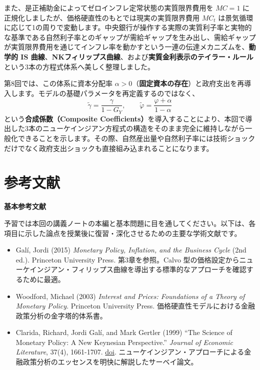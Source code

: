 \documentclass[
  japanese,
  lualatex,
  ja=standard,
  12pt,
  a4paper]{ltjsarticle}
\providecommand{\tightlist}{%
  \setlength{\itemsep}{0pt}\setlength{\parskip}{0pt}}
\begin{document}
また、是正補助金によってゼロインフレ定常状態の実質限界費用を \(MC=1\)
に正規化しましたが、価格硬直性のもとでは現実の実質限界費用 \(MC_t\)
は景気循環に応じて1の周りで変動します。中央銀行が操作する実際の実質利子率と実物的な基準である自然利子率とのギャップが需給ギャップを生み出し、需給ギャップが実質限界費用を通じてインフレ率を動かすという一連の伝達メカニズムを、\textbf{動学的
IS
曲線}、\textbf{NKフィリップス曲線}、および\textbf{実質金利表示のテイラー・ルール}という3本の方程式体系へ美しく整理しました。

第8回では、この体系に資本分配率
\(\alpha>0\)（\textbf{固定資本の存在}）と政府支出を再導入します。モデルの基礎パラメータを再定義するのではなく、
\[
\tilde{\gamma}=\frac{\gamma}{1-G_Y},
\qquad
\tilde{\varphi}=\frac{\varphi+\alpha}{1-\alpha}
\] という\textbf{合成係数（Composite
Coefficients）}を導入することにより、本回で導出した3本のニューケインジアン方程式の構造をそのまま完全に維持しながら一般化できることを示します。その際、自然産出量や自然利子率には技術ショックだけでなく政府支出ショックも直接組み込まれることになります。

\Needspace{0.32\textheight}

\section{参考文献}\label{ux53c2ux8003ux6587ux732e}

\textbf{基本参考文献}

予習では本回の講義ノートの本編と基本問題に目を通してください。以下は、各項目に示した論点を授業後に復習・深化させるための主要な学術文献です。

\begin{itemize}
\tightlist
\item
  Galí, Jordi (2015) \emph{Monetary Policy, Inflation, and the Business
  Cycle} (2nd ed.). Princeton University Press. 第3章を参照。Calvo
  型の価格設定からニューケインジアン・フィリップス曲線を導出する標準的なアプローチを確認するために最適。
\item
  Woodford, Michael (2003) \emph{Interest and Prices: Foundations of a
  Theory of Monetary Policy}. Princeton University Press.
  価格硬直性モデルにおける金融政策分析の金字塔的体系書。
\item
  Clarida, Richard, Jordi Galí, and Mark Gertler (1999) ``The Science of
  Monetary Policy: A New Keynesian Perspective.'' \emph{Journal of
  Economic Literature}, 37(4), 1661-1707.
  \href{https://doi.org/10.1257/jel.37.4.1661}{doi}.
  ニューケインジアン・アプローチによる金融政策分析のエッセンスを明快に解説したサーベイ論文。
\end{itemize}
\end{document}
